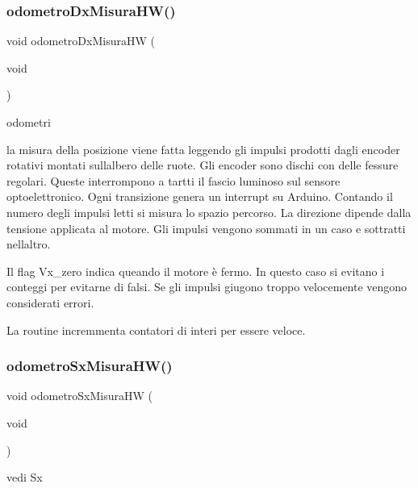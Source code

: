 \subsubsection{\texorpdfstring{odometro\+Dx\+Misura\+H\+W()}{odometroDxMisuraHW()}}
{\footnotesize\ttfamily void odometro\+Dx\+Misura\+HW (\begin{DoxyParamCaption}\item[{void}]{ }\end{DoxyParamCaption})}



odometri 

la misura della posizione viene fatta leggendo gli impulsi prodotti dagli encoder rotativi montati sull\textquotesingle{}albero delle ruote. Gli encoder sono dischi con delle fessure regolari. Queste interrompono a tartti il fascio luminoso sul sensore optoelettronico. Ogni transizione genera un interrupt su Arduino. Contando il numero degli impulsi letti si misura lo spazio percorso. La direzione dipende dalla tensione applicata al motore. Gli impulsi vengono sommati in un caso e sottratti nell\textquotesingle{}altro.

Il flag Vx\+\_\+zero indica queando il motore è fermo. In questo caso si evitano i conteggi per evitarne di falsi. Se gli impulsi giugono troppo velocemente vengono considerati errori.

La routine incremmenta contatori di interi per essere veloce. \mbox{\label{ari_pi__2_d_c__esp__08_8ino_aef8d9e68883244c4d12fb9dfb14b0b2e}} 
\subsubsection{\texorpdfstring{odometro\+Sx\+Misura\+H\+W()}{odometroSxMisuraHW()}}
{\footnotesize\ttfamily void odometro\+Sx\+Misura\+HW (\begin{DoxyParamCaption}\item[{void}]{ }\end{DoxyParamCaption})}



vedi Sx 

\mbox{\label{ari_pi__2_d_c__esp__08_8ino_abbdedc0823a18fd32dee96e0acad447e}} 
